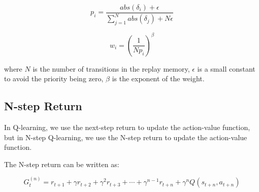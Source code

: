 \begin{equation}
    p_i = \frac{abs(\delta_i) + \epsilon}{\sum_{j=1}^{N} abs(\delta_j) + N \epsilon}
\end{equation}

\begin{equation}
    w_i = \left( \frac{1}{N p_i} \right)^{\beta}
\end{equation}

where $N$ is the number of transitions in the replay memory, $\epsilon$ is a small constant to avoid the priority being zero, $\beta$ is the exponent of the weight.

\subsection{N-step Return}
In Q-learning, we use the next-step return to update the action-value function, but in N-step Q-learning, we use the N-step return to update the action-value function.

The N-step return can be written as:

\begin{equation}
    G_t^{(n)} = r_{t+1} + \gamma r_{t+2} + \gamma^2 r_{t+3} + \cdots + \gamma^{n-1} r_{t+n} + \gamma^n Q(s_{t+n}, a_{t+n})
\end{equation}

